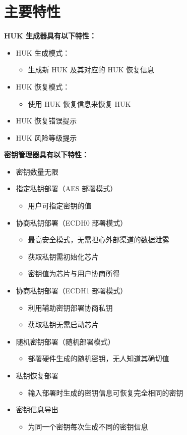 \documentclass[main\_\_CN.tex]{subfiles}
\begin{document}
\section{主要特性}
\label{sec:keymng-features}
\textbf{HUK 生成器具有以下特性：}
\begin{itemize}
    \item HUK 生成模式：
    \begin{itemize}
        \item 生成新 HUK 及其对应的 HUK 恢复信息
    \end{itemize}
    \item HUK 恢复模式：
    \begin{itemize}
        \item 使用 HUK 恢复信息来恢复 HUK
    \end{itemize}
    \item HUK 恢复错误提示
    \item HUK 风险等级提示
\end{itemize}

\textbf{密钥管理器具有以下特性：}
\begin{itemize}
    \item 密钥数量无限
    \item 指定私钥部署（AES 部署模式）
    \begin{itemize}
        
        \item 用户可指定密钥的值
    \end{itemize}
    \item 协商私钥部署（ECDH0 部署模式）
    \begin{itemize}
        \item 最高安全模式，无需担心外部渠道的数据泄露
        \item 获取私钥需初始化芯片
        \item 密钥值为芯片与用户协商所得
    \end{itemize}
    \item 协商私钥部署（ECDH1 部署模式）
    \begin{itemize}
        \item 利用辅助密钥部署协商私钥
        \item 获取私钥无需启动芯片
    \end{itemize}
    \item 随机密钥部署（随机部署模式）
    \begin{itemize}
        \item 部署硬件生成的随机密钥，无人知道其确切值
    \end{itemize}
    \item 私钥恢复部署
    \begin{itemize}
        \item 输入部署时生成的密钥信息可恢复完全相同的密钥
    \end{itemize}
    \item 密钥信息导出
    \begin{itemize}
        \item 为同一个密钥每次生成不同的密钥信息
    \end{itemize}
\end{itemize}
\end{document}
